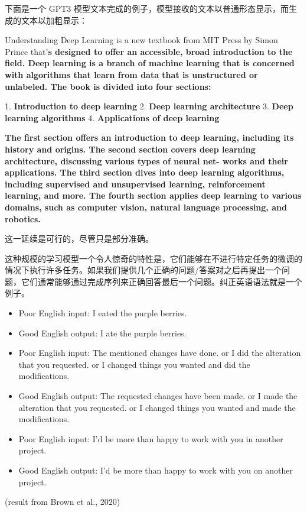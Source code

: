 \documentclass[lang=cn,newtx,10pt,scheme=chinese]{elegantbook}
\begin{document}
下面是一个 GPT3 模型文本完成的例子，模型接收的文本以普通形态显示，而生成的文本以加粗显示：

Understanding Deep Learning is a new textbook from MIT Press by Simon Prince that’\textbf{s designed to offer an accessible, broad introduction to the field. Deep learning is a branch of machine learning that is concerned with algorithms that learn from data that is unstructured or unlabeled. The book is divided into four sections:}

1. \textbf{Introduction to deep learning} 
2. \textbf{Deep learning architecture}
3. \textbf{Deep learning algorithms}
4. \textbf{Applications of deep learning}

\textbf{The first section offers an introduction to deep learning, including its history and origins. The second section covers deep learning architecture, discussing various types of neural net- works and their applications. The third section dives into deep learning algorithms, including supervised and unsupervised learning, reinforcement learning, and more. The fourth section applies deep learning to various domains, such as computer vision, natural language processing, and robotics.}


这一延续是可行的，尽管只是部分准确。

这种规模的学习模型一个令人惊奇的特性是，它们能够在不进行特定任务的微调的情况下执行许多任务。如果我们提供几个正确的问题/答案对之后再提出一个问题，它们通常能够通过完成序列来正确回答最后一个问题。纠正英语语法就是一个例子。

\begin{itemize}
    \item Poor English input: I eated the purple berries.  
    \item Good English output: I ate the purple berries.  
    \item Poor English input: The mentioned changes have done. or I did the alteration that you requested. or I changed things you wanted and did the modifications. 
    \item Good English output: The requested changes have been made. or I made the alteration that you requested. or I changed things you wanted and made the modifications.  
    \item Poor English input: I’d be more than happy to work with you in another project. 
    \item Good English output: I’d be more than happy to work with you on another project. 
\end{itemize}
(result from Brown et al., 2020)
\end{document}

